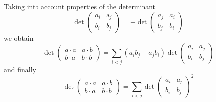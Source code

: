 \documentclass[color=black,11pt]{elegantpaper}
\begin{document}
Taking into account properties of the determinant
$$
 \det\left( \begin{array}{cc}
                                       a_i & a_j \\
                                       b_i & b_j
                                   \end{array}\right) = - \det\left( \begin{array}{cc}
                                       a_j & a_i \\
                                       b_j & b_i
                                   \end{array}\right)
$$
we obtain
$$
\det\left( \begin{array}{cc}
                                       a\cdot a & a\cdot b \\
                                       b\cdot a & b \cdot b
                                   \end{array}\right)=
\sum_{i<j} (a_i b_j - a_j b_i)
 \det\left( \begin{array}{cc}
                                       a_i & a_j \\
                                       b_i & b_j
                                   \end{array}\right)
$$
and finally
$$
\det\left( \begin{array}{cc}
                                       a\cdot a & a\cdot b \\
                                       b\cdot a & b \cdot b
                                   \end{array}\right)=
\sum_{i<j}
 \det\left( \begin{array}{cc}
                                       a_i & a_j \\
                                       b_i & b_j
                                   \end{array}\right)^2
$$
\end{document}

